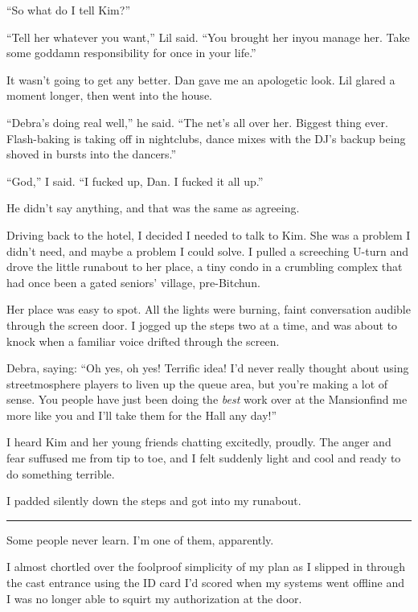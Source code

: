 “So what do I tell Kim?”

“Tell her whatever you want,” Lil said. “You brought her in{\dash}you
manage her. Take some goddamn responsibility for once in your
life.”

It wasn't going to get any better. Dan gave me an apologetic look.
Lil glared a moment longer, then went into the house.

“Debra's doing real well,” he said. “The net's all over her.
Biggest thing ever. Flash-baking is taking off in nightclubs, dance
mixes with the DJ's backup being shoved in bursts into the
dancers.”

“God,” I said. “I fucked up, Dan. I fucked it all up.”

He didn't say anything, and that was the same as agreeing.

Driving back to the hotel, I decided I needed to talk to Kim. She
was a problem I didn't need, and maybe a problem I could solve. I
pulled a screeching U-turn and drove the little runabout to her
place, a tiny condo in a crumbling complex that had once been a
gated seniors' village, pre-Bitchun.

Her place was easy to spot. All the lights were burning, faint
conversation audible through the screen door. I jogged up the steps
two at a time, and was about to knock when a familiar voice drifted
through the screen.

Debra, saying: “Oh yes, oh yes! Terrific idea! I'd never really
thought about using streetmosphere players to liven up the queue
area, but you're making a lot of sense. You people have just been
doing the \emph{best} work over at the Mansion{\dash}find me more like
you and I'll take them for the Hall any day!”

I heard Kim and her young friends chatting excitedly, proudly. The
anger and fear suffused me from tip to toe, and I felt suddenly
light and cool and ready to do something terrible.

I padded silently down the steps and got into my runabout.

\begin{center}\rule{3in}{0.4pt}\end{center}

Some people never learn. I'm one of them, apparently.

I almost chortled over the foolproof simplicity of my plan as I
slipped in through the cast entrance using the ID card I'd scored
when my systems went offline and I was no longer able to squirt my
authorization at the door.


